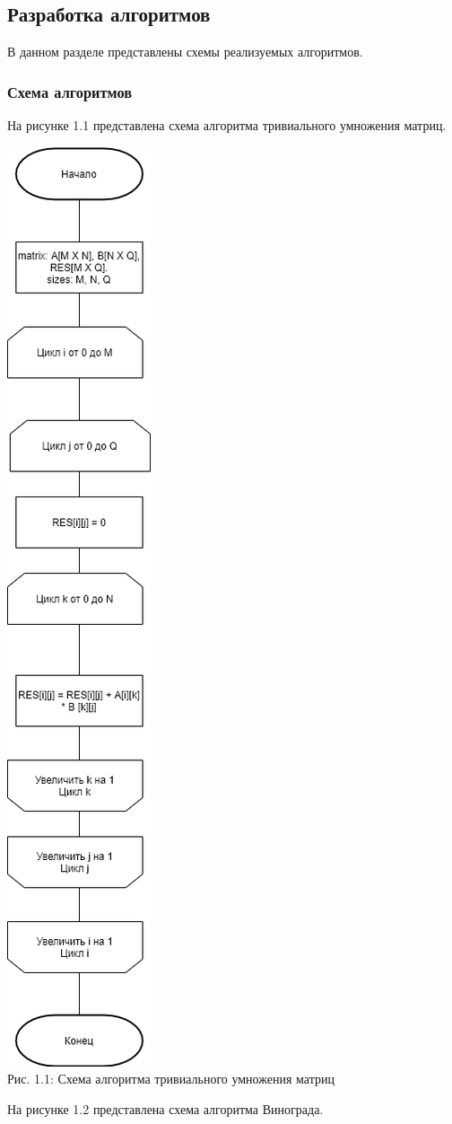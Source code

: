 \documentclass[12pt,a4paper]{article}
\numberwithin{equation}{section}
\begin{document}
\subsection{Разработка алгоритмов} %
\qquad В данном разделе представлены схемы реализуемых алгоритмов.
\subsubsection{Схема алгоритмов}
На рисунке 1.1 представлена схема алгоритма тривиального умножения матриц.
\begin{center}	
	\includegraphics[width=0.18\linewidth]{src/schemas/mult_trivial}\\
	Рис. 1.1: Схема алгоритма тривиального умножения матриц
\end{center}
\clearpage
На рисунке 1.2 представлена схема алгоритма Винограда.
\end{document}
